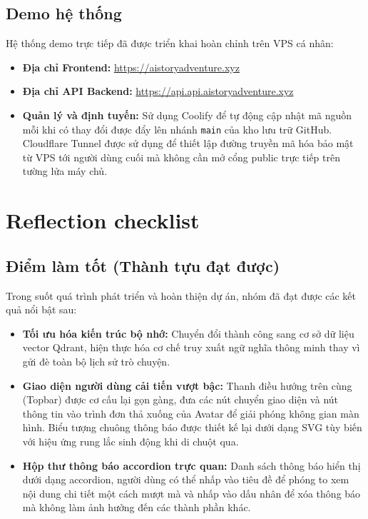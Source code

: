 \documentclass[a4paper]{article}
\begin{document}
\begin{titlepage}
\subsection{Demo hệ thống}
Hệ thống demo trực tiếp đã được triển khai hoàn chỉnh trên VPS cá nhân:
\begin{itemize}
    \item \textbf{Địa chỉ Frontend:} \url{https://aistoryadventure.xyz}
    \item \textbf{Địa chỉ API Backend:} \url{https://api.api.aistoryadventure.xyz}
    \item \textbf{Quản lý và định tuyến:} Sử dụng Coolify để tự động cập nhật mã nguồn mỗi khi có thay đổi được đẩy lên nhánh \texttt{main} của kho lưu trữ GitHub. Cloudflare Tunnel được sử dụng để thiết lập đường truyền mã hóa bảo mật từ VPS tới người dùng cuối mà không cần mở cổng public trực tiếp trên tường lửa máy chủ.
\end{itemize}

\section{Reflection checklist}

\subsection{Điểm làm tốt (Thành tựu đạt được)}
Trong suốt quá trình phát triển và hoàn thiện dự án, nhóm đã đạt được các kết quả nổi bật sau:
\begin{itemize}
    \item \textbf{Tối ưu hóa kiến trúc bộ nhớ:} Chuyển đổi thành công sang cơ sở dữ liệu vector Qdrant, hiện thực hóa cơ chế truy xuất ngữ nghĩa thông minh thay vì gửi đè toàn bộ lịch sử trò chuyện.
    \item \textbf{Giao diện người dùng cải tiến vượt bậc:} Thanh điều hướng trên cùng (Topbar) được cơ cấu lại gọn gàng, đưa các nút chuyển giao diện và nút thông tin vào trình đơn thả xuống của Avatar để giải phóng không gian màn hình. Biểu tượng chuông thông báo được thiết kế lại dưới dạng SVG tùy biến với hiệu ứng rung lắc sinh động khi di chuột qua.
    \item \textbf{Hộp thư thông báo accordion trực quan:} Danh sách thông báo hiển thị dưới dạng accordion, người dùng có thể nhấp vào tiêu đề để phóng to xem nội dung chi tiết một cách mượt mà và nhấp vào dấu nhân để xóa thông báo mà không làm ảnh hưởng đến các thành phần khác.
\end{itemize}


\end{titlepage}
\end{document}
